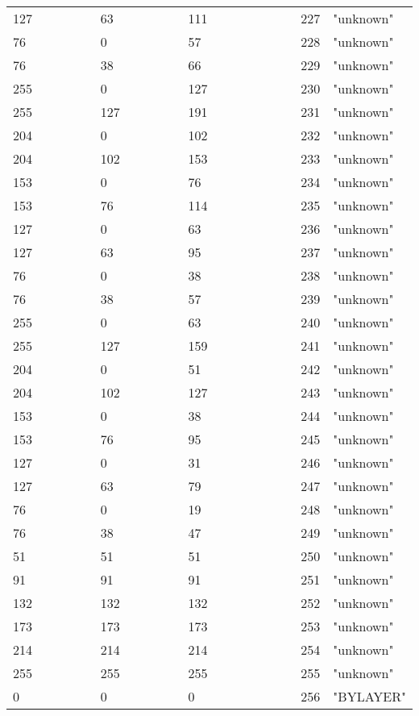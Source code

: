 \begin{longtable}{p{0.3\linewidth} p{0.3\linewidth} p{0.4\linewidth}}
127 &   63 &  111 &  227 &  "unknown"\\
 76 &    0 &   57 &  228 &  "unknown"\\
 76 &   38 &   66 &  229 &  "unknown"\\
255 &    0 &  127 &  230 &  "unknown"\\
255 &  127 &  191 &  231 &  "unknown"\\
204 &    0 &  102 &  232 &  "unknown"\\
204 &  102 &  153 &  233 &  "unknown"\\
153 &    0 &   76 &  234 &  "unknown"\\
153 &   76 &  114 &  235 &  "unknown"\\
127 &    0 &   63 &  236 &  "unknown"\\
127 &   63 &   95 &  237 &  "unknown"\\
 76 &    0 &   38 &  238 &  "unknown"\\
 76 &   38 &   57 &  239 &  "unknown"\\
255 &    0 &   63 &  240 &  "unknown"\\
255 &  127 &  159 &  241 &  "unknown"\\
204 &    0 &   51 &  242 &  "unknown"\\
204 &  102 &  127 &  243 &  "unknown"\\
153 &    0 &   38 &  244 &  "unknown"\\
153 &   76 &   95 &  245 &  "unknown"\\
127 &    0 &   31 &  246 &  "unknown"\\
127 &   63 &   79 &  247 &  "unknown"\\
 76 &    0 &   19 &  248 &  "unknown"\\
 76 &   38 &   47 &  249 &  "unknown"\\
 51 &   51 &   51 &  250 &  "unknown"\\
 91 &   91 &   91 &  251 &  "unknown"\\
132 &  132 &  132 &  252 &  "unknown"\\
173 &  173 &  173 &  253 &  "unknown"\\
214 &  214 &  214 &  254 &  "unknown"\\
255 &  255 &  255 &  255 &  "unknown"\\
  0 &    0 &    0 &  256 &  "BYLAYER"\\

\end{longtable}
